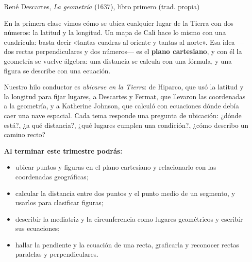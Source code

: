 \documentclass[11pt]{article}
\begin{document}
\encabezado

{René Descartes, \emph{La geometría} (1637), libro primero (trad. propia)}


En la primera clase vimos cómo se ubica cualquier lugar de la Tierra con dos
números: la latitud y la longitud. Un mapa de Cali hace lo mismo con una
cuadrícula: basta decir «tantas cuadras al oriente y tantas al norte». Esa idea
—dos rectas perpendiculares y dos números— es el \textbf{plano cartesiano}, y
con él la geometría se vuelve álgebra: una distancia se calcula con una
fórmula, y una figura se describe con una ecuación.

Nuestro hilo conductor es \emph{ubicarse en la Tierra}: de Hiparco, que usó la
latitud y la longitud para fijar lugares, a Descartes y Fermat, que llevaron las
coordenadas a la geometría, y a Katherine Johnson, que calculó con ecuaciones
dónde debía caer una nave espacial. Cada tema responde una pregunta de
ubicación: ¿dónde está?, ¿a qué distancia?, ¿qué lugares cumplen una
condición?, ¿cómo describo un camino recto?

\textbf{Al terminar este trimestre podrás:}
\begin{itemize}
  \item ubicar puntos y figuras en el plano cartesiano y relacionarlo con las
        coordenadas geográficas;
  \item calcular la distancia entre dos puntos y el punto medio de un segmento,
        y usarlos para clasificar figuras;
  \item describir la mediatriz y la circunferencia como lugares geométricos y
        escribir sus ecuaciones;
  \item hallar la pendiente y la ecuación de una recta, graficarla y reconocer
        rectas paralelas y perpendiculares.
\end{itemize}
\end{document}
